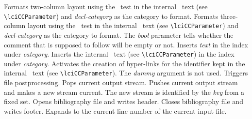 \documentclass[12pt]{article}
\begin{document}
\begin{description}
    Formats two-column layout using the \CC\ test in the internal \CC\ text
    (see \verb+\lciCCParameter+) and {\em decl-category} as the category 
    to format.
    Formats three-column layout using the \CC\ test in the internal \CC\ text
    (see \verb+\lciCCParameter+) and {\em decl-category} as the category 
    to format. The {\em bool\/} parameter tells whether the comment that 
    is supposed to follow will be empty or not.
    Inserts {\em text\/} in the index under {\em category}.
    Inserts the internal \CC\ text (see \verb+\lciCCParameter+) in the 
    index under {\em category}.
    Activates the creation of hyper-links for the identifier kept in the 
    internal \CC\ text (see \verb+\lciCCParameter+). The {\em dummy\/}
    argument is not used.
    Triggers file postprocessing.
    Pops current output stream.
    Pushes current output stream and makes a new stream current.
    The new stream is identified by the {\em key\/} from a fixed set.
    Opens bibliography file and writes header.
    Closes bibliography file and writes footer.
    Expands to the current line number of the current input file.
\end{description}





\newpage

%


\small
\printindex
\end{document}
